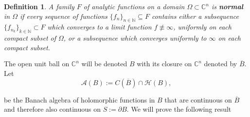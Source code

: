 \documentclass[12pt,twoside,a4paper]{report}
\newtheorem{definition}{Definition}[section]
\newcommand{\nat}{\ensuremath{ \mathbb N }}
\newcommand{\co}{\ensuremath{\mathbb C }}
\newcommand{\con}{\ensuremath{\mathbb{C}^n}}
\newcommand{\hsheaf}{\ensuremath{\mathcal H }}
\begin{document}
  \begin{definition}
    A family $F$ of analytic functions on a domain $\Omega\subset\co^{n}$ is \textbf{normal} in $\Omega$ if every sequence of functions $\lbrace{f_n}\rbrace_{n\in\nat}\subseteq{F}$ contains either a subsequence $\lbrace f_{n_k}\rbrace_{k\in\nat}\subset F$  which converges to a limit function $f\not\equiv\infty$,  uniformly on each compact subset of  $\Omega$, or a subsequence  which converges uniformly to $\infty$ on each compact subset.
  \end{definition}

  The open unit ball on $\con$ will be denoted $B$ with its closure on $\con$ denoted by $\overline{B}$. Let
  \[
    \mathcal{A}(B):=C(\overline{B})\cap\hsheaf(B),
  \]

  \noindent be the Banach algebra of holomorphic functions in $B$ that are
  continuous on $\overline{B}$ and therefore also continuous on $S:=\partial B$. We will prove the following result
\end{document}
